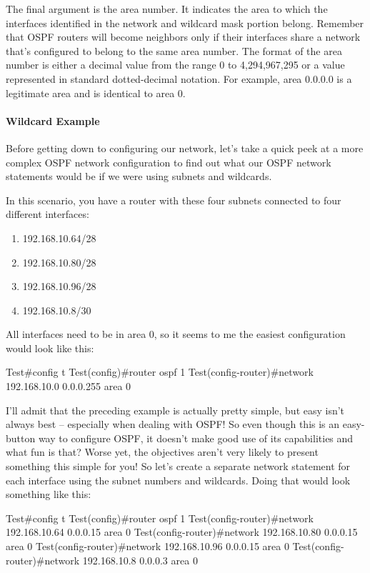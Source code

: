 The final argument is the area number. It indicates the area to which
the interfaces identified in the network and wildcard mask portion
belong. Remember that OSPF routers will become neighbors only if their
interfaces share a network that's configured to belong to the same area
number. The format of the area number is either a decimal value from the
range 0 to 4,294,967,295 or a value represented in standard
dotted-decimal notation. For example, area 0.0.0.0 is a legitimate area
and is identical to area 0.

\paragraph{Wildcard Example}

Before getting down to configuring our network, let's take a quick peek
at a more complex OSPF network configuration to find out what our OSPF
network statements would be if we were using subnets and wildcards.

In this scenario, you have a router with these four subnets connected to
four different interfaces:

\begin{enumerate}
\item
  192.168.10.64/28
\item
  192.168.10.80/28
\item
  192.168.10.96/28
\item
  192.168.10.8/30
\end{enumerate}

All interfaces need to be in area 0, so it seems to me the easiest
configuration would look like this:

\begin{cli}
Test#config t
Test(config)#router ospf 1
Test(config-router)#network 192.168.10.0 0.0.0.255 area 0
\end{cli}

I'll admit that the preceding example is actually pretty simple, but
easy isn't always best -- especially when dealing with OSPF! So even
though this is an easy-button way to configure OSPF, it doesn't make
good use of its capabilities and what fun is that? Worse
\protect\hypertarget{c18.xhtmlux5cux23Page_756}{}{}yet, the objectives
aren't very likely to present something this simple for you! So let's
create a separate network statement for each interface using the subnet
numbers and wildcards. Doing that would look something like this:

\begin{cli}
Test#config t
Test(config)#router ospf 1
Test(config-router)#network 192.168.10.64 0.0.0.15 area 0
Test(config-router)#network 192.168.10.80 0.0.0.15 area 0
Test(config-router)#network 192.168.10.96 0.0.0.15 area 0
Test(config-router)#network 192.168.10.8 0.0.0.3 area 0
\end{cli}

